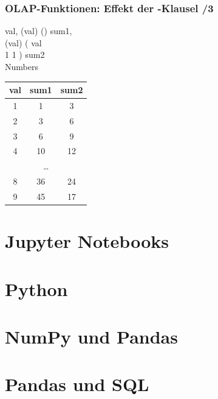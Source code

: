     \begin{frame}
    
      \frametitle{OLAP-Funktionen: Effekt der -Klausel /3}
    
      \begin{sql}
         val, (val) ()  sum1, \\
        \1 (val) ( val \\
        \2  1  1 )  sum2 \\
         Numbers
      \end{sql}
    
      \begin{center}
        \begin{tabular}{|c|c|c|}
        \hline
        \rowcolor{Gray} val & sum1 & sum2 \\
        \hline \hline
        1& 1 & 3 \\
        2 & 3 & 6 \\
        3 & 6 & 9 \\
        4 & 10 & 12 \\
        \multicolumn{3}{|c|}{\dots} \\
        8 & 36 & 24 \\
        9 & 45 & 17 \\
        \hline
        \end{tabular}
        \end{center}
    
      \end{frame}
    

\section{Jupyter Notebooks}

\section{Python}

\section{NumPy und Pandas}

\section{Pandas und SQL}